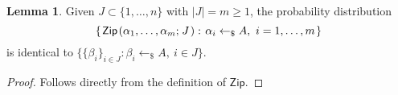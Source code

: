 \documentclass[psamsfonts, reqno]{amsart}
\theoremstyle{definition}
\newtheorem{lemma}[thm]{Lemma}
\theoremstyle{remark}
\numberwithin{equation}{section}
\begin{document}
\begin{lemma}\label{zip_lemma}
Given $J \subset \{1, \dots, n\}$ with $|J| = m \ge 1$,
the probability distribution
\vspace{5pt}
\begin{equation*}
\{\hspace{1pt}
\mathsf{Zip}\hspace{1pt}(
\alpha_1, \dots, \alpha_m;\hspace{1pt} J\hspace{1pt}):
\hspace{1pt}\alpha_i \leftarrow_\$ A,
\ i = 1, \dots, m
\hspace{1pt}\}
\vspace{5pt}
\end{equation*}
is identical to
$\{\{\beta_i\}_{i \in J}: \beta_i \leftarrow_\$ A,\ i \in J\}$.
\end{lemma}

\begin{proof}
Follows directly from the definition of $\mathsf{Zip}$.
\end{proof}
\end{document}
